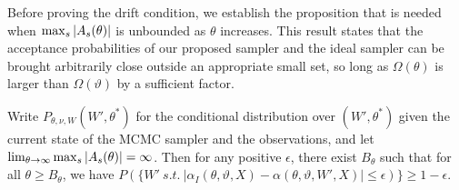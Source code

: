 \noindent Before proving the drift condition, we establish the proposition that
is needed when ${\max_s |A_s(\theta)|}$ is unbounded as $\theta$ increases.
This result states that the acceptance probabilities of our proposed
sampler and the ideal sampler can be brought arbitrarily close
outside an appropriate small set, so long as $\Omega(\theta)$ is larger
than $\Omega(\vartheta)$ by a sufficient factor. 
\begin{proposition}
  Write $P_{\theta,\nu,W}(W',\theta^*)$ for the conditional distribution 
  over $(W',\theta^*)$ given the current state of the MCMC sampler and the 
  observations, and let
  $\lim_{\theta\rightarrow\infty} {\max_s |A_s(\theta)|} = \infty$. Then for any positive 
  $\epsilon$, there exist $B_\theta$ such that for all 
  $\theta \ge B_\theta$, %
  we have 
  $P(\{W'\ s.t.\ |\alpha_I(\theta,\vartheta,X) - \alpha(\theta,\vartheta,W',X)| 
  \le \epsilon)\} \ge 1-\epsilon$.%
\label{prop:mix}
\end{proposition}
